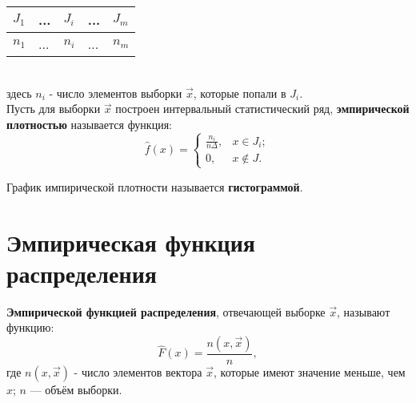 \begin{tabular}{ | l | l | l | l | l | }
	\hline
	$J_1$ & ... & $J_i$ & ... & $J_m$ \\ 
	\hline
	$n_1$ & ... & $n_i$ & ... & $n_m$ \\
	\hline
\end{tabular}\\

здесь $n_i$ - число элементов выборки $\vec x$, которые попали в $J_i$.  \\

Пусть для выборки $\vec x$ построен интервальный статистический ряд, \textbf{эмпирической плотностью} называется функция:  
\begin{equation*}
	\hat{f}(x) = \begin{cases}
		\frac{n_{i}}{n\Delta}, & x\in J_{i};\\
		0,                     & x\notin J.
	\end{cases}
\end{equation*}

График импирической плотности называется \textbf{гистограммой}.

\section{Эмпирическая функция распределения}
\textbf{Эмпирической функцией распределения}, отвечающей выборке $\vec x$, называют функцию:
\begin{equation*}
	\hat{F}(x) = \frac{n(x, \vec{x})}{n},
\end{equation*}
	где $n(x, \vec{x})$ - число элементов вектора $\vec x$, которые имеют значение меньше, чем $x$; $n$ — объём выборки.